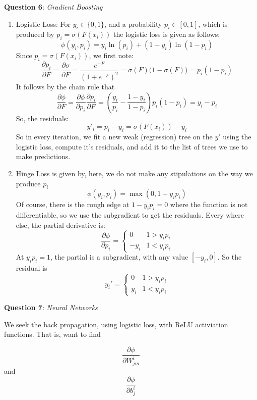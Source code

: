 \documentclass{article} %
\newcommand{\question}[2][]{
  \begin{flushleft}
    \textbf{Question #1}: \textit{#2}

\end{flushleft}}
\begin{document}
\question[6]{Gradient Boosting}
\begin{enumerate}
  \item Logistic Loss: For $y_i \in \{0, 1\}$, and a probability $p_i
    \in  [0,1]$, which is produced by $p_i = \sigma(F(x_i))$ the
    logistic loss is given as follows:
    \[
      \phi(y_i, p_i) = y_i\ln(p_i) + (1-y_i)\ln(1-p_i)
    \]
    Since $p_i = \sigma(F(x_i))$, we first note:
    \[
      \frac{\partial p_i}{\partial F} = \frac{\partial \sigma}{\partial F}
      = \frac{e^{-F}}{(1+e^{-F})^2} =
      \sigma(F)\bigl(1-\sigma(F)\bigr) = p_i(1-p_i)
    \]
    It follows by the chain rule that
    \[
      \frac{\partial \phi}{\partial F} = \frac{\partial
      \phi}{\partial p_i}\frac{\partial p_i}{\partial F}=\left(\frac{y_i}{p_i} -
      \frac{1-y_i}{1-p_i}\right)p_i(1-p_i) = y_i - p_i
    \]
    So, the residuals:
    \[
      y'_i = p_i - y_i = \sigma(F(x_i)) - y_i
    \]
    So in every iteration, we fit a new weak (regression) tree on the $y'$ using
    the logistic loss, compute it's residuals, and add it to the list
    of trees we use to make predictions.
  \item Hinge Loss is given by, here, we do not make any stipulations
    on the way we produce $p_i$
    $$
    \phi(y_i, p_i) = \max(0, 1-y_ip_i)
    $$
    Of course, there is the rough edge at $1-y_ip_i = 0$ where the
    function is not differentiable, so we use the subgradient to get
    the residuals. Every where else, the partial derivative is:
    \[
      \frac{\partial\phi}{\partial p_i} =
      \begin{cases}
        0 & 1 > y_ip_i \\
        -y_i & 1 < y_ip_i
      \end{cases}
    \]
    At $y_ip_i = 1$, the partial is a subgradient, with any value
    $[-y_i, 0]$. So the residual is
    $$
    y_i' =
    \begin{cases}
      0 & 1 > y_ip_i \\
      y_i & 1 < y_ip_i
    \end{cases}
    $$
\end{enumerate}
\question[7]{Neural Networks}
We seek the back propagation, using
logistic loss, with ReLU activiation functions. That is, want to find

\[
  \frac{\partial \phi}{\partial W^i_{jm}}
\]
and
\[
  \frac{\partial \phi}{\partial b^i_j}
\]
\end{document}
